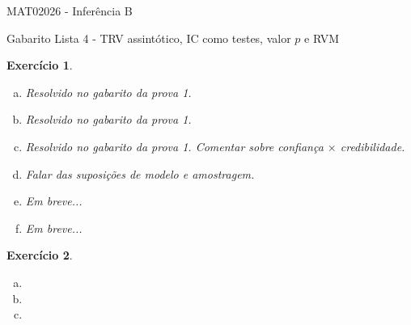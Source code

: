 \documentclass[letter,11pt]{article}
\newtheorem{exer}{Exercício}
\begin{document}
\begin{center}{ \Large MAT02026 - Inferência B }\end{center}

\begin{center}
{\large  \sc Gabarito Lista 4 - TRV assintótico, IC como testes, valor $p$ e RVM}
\end{center}
\vspace{5mm}

\begin{exer} \rm
\begin{enumerate}[a)]
  \item %
  Resolvido no gabarito da prova 1.
  
  \item %
  Resolvido no gabarito da prova 1.
  
  \item %
  Resolvido no gabarito da prova 1. 
  Comentar sobre confiança $\times$ credibilidade.
  
  \item %
  Falar das suposições de modelo e amostragem.

  \item %
  Em breve...

  \item %
  Em breve...
  
\end{enumerate}
\end{exer}


\begin{exer} \rm
\begin{enumerate}[a)]
  \item %
  \item %
  \item %
\end{enumerate}
\end{exer}
\end{document}
